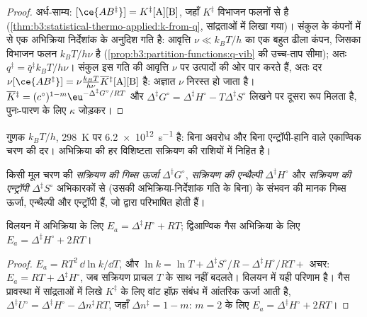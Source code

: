 \begin{proof}
अर्ध-साम्य: $[\ce{AB^{\ddagger}}] = K^{\ddagger}[\mathrm A][\mathrm B]$, जहाँ $K^{\ddagger}$ विभाजन फलनों से है
(\cref{thm:b3:statistical-thermo-applied:k-from-q}, सांद्रताओं में लिखा गया)।
संकुल के कंपनों में से एक अभिक्रिया
निर्देशांक के अनुदिश गति है: आवृत्ति $\nu \ll k_BT/h$ का एक बहुत ढीला कंपन, जिसका विभाजन
फलन $k_BT/h\nu$ है (\cref{prop:b3:partition-functions:q-vib} की
उच्च-ताप सीमा); अतः $q^{\ddagger} = \bar q^{\ddagger}k_BT/h\nu$।
संकुल इस गति की आवृत्ति $\nu$ पर उत्पादों की ओर पार करते हैं, अतः
दर $\nu[\ce{AB^{\ddagger}}] = \nu\frac{k_BT}{h\nu}\overline{K}{}^{\ddagger}[\mathrm A][\mathrm B]$ है: अज्ञात $\nu$ निरस्त हो जाता है।
$\overline{K}{}^{\ddagger} = (c^\circ)^{1-m}\eu^{-\Delta^{\ddagger}G^\circ/RT}$ और $\Delta^{\ddagger}G^\circ = \Delta^{\ddagger}H^\circ - T\Delta^{\ddagger}S^\circ$ लिखने पर
दूसरा रूप मिलता है, पुनः-पारण के लिए $\kappa$ जोड़कर।
\end{proof}

गुणक $k_BT/h$, \qty{298}{K} पर \qty{6.2e12}{s^{-1}} है: बिना अवरोध और बिना एन्ट्रॉपी-हानि
वाले एकाण्विक चरण की दर। अभिक्रिया की हर विशिष्टता
सक्रियण की राशियों में निहित है।

\begin{definition}[सक्रियण की गिब्स ऊर्जा, एन्थैल्पी और एन्ट्रॉपी]\label{def:b3:rate-theories:activation}
किसी मूल चरण की \emph{सक्रियण की गिब्स ऊर्जा}
$\Delta^{\ddagger}G^\circ$, \emph{सक्रियण की एन्थैल्पी} $\Delta^{\ddagger}H^\circ$ और
\emph{सक्रियण की एन्ट्रॉपी} $\Delta^{\ddagger}S^\circ$
अभिकारकों से  (उसकी अभिक्रिया-निर्देशांक गति के बिना) के संभवन की
मानक गिब्स ऊर्जा, एन्थैल्पी और एन्ट्रॉपी हैं, जो
 द्वारा परिभाषित होती हैं।
\end{definition}

\begin{proposition}[सक्रियण ऊर्जा और सक्रियण की एन्थैल्पी]\label{prop:b3:rate-theories:ea-dh}
विलयन में अभिक्रिया के लिए $E_a = \Delta^{\ddagger}H^\circ + RT$; द्विआण्विक गैस अभिक्रिया के लिए
$E_a = \Delta^{\ddagger}H^\circ + 2RT$।
\end{proposition}

\begin{proof}
$E_a = RT^2\,\dd\ln k/\dd T$, और $\ln k = \ln T + \Delta^{\ddagger}S^\circ/R - \Delta^{\ddagger}H^\circ/RT + $ अचर: $E_a =
RT + \Delta^{\ddagger}H^\circ$, जब सक्रियण प्राचल $T$ के साथ नहीं बदलते। विलयन में
यही परिणाम है। गैस प्रावस्था में सांद्रताओं में लिखे $K^{\ddagger}$ के लिए वांट हॉफ़ संबंध
में आंतरिक ऊर्जा आती है, $\Delta^{\ddagger}U^\circ = \Delta^{\ddagger}H^\circ - \Delta n^{\ddagger}RT$,
जहाँ $\Delta n^{\ddagger} = 1 - m$: $m = 2$ के लिए $E_a = \Delta^{\ddagger}H^\circ + 2RT$।
\end{proof}

